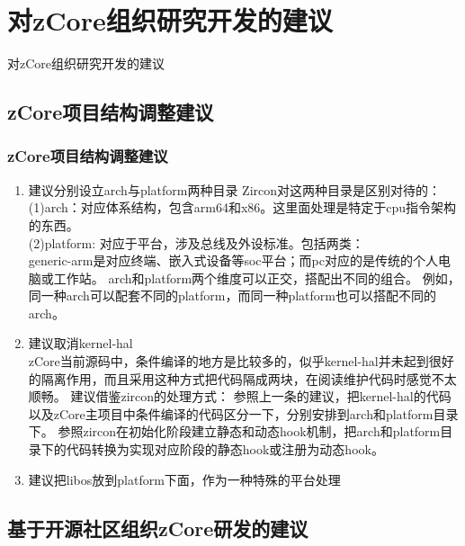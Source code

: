 \documentclass[
8pt, %
]{beamer}
\begin{document}
	\section{对zCore组织研究开发的建议}

	\begin{frame}
		\begin{center}
			{\LARGE 对zCore组织研究开发的建议\\}
		\end{center}
	\end{frame}

	\subsection{zCore项目结构调整建议}

	\begin{frame}
		\frametitle{zCore项目结构调整建议}
		\begin{enumerate}
			\item 建议分别设立arch与platform两种目录
			Zircon对这两种目录是区别对待的：\\
			(1)arch：对应体系结构，包含arm64和x86。这里面处理是特定于cpu指令架构的东西。\\
			(2)platform: 对应于平台，涉及总线及外设标准。包括两类：\\
			generic-arm是对应终端、嵌入式设备等soc平台；而pc对应的是传统的个人电脑或工作站。
			arch和platform两个维度可以正交，搭配出不同的组合。
			例如，同一种arch可以配套不同的platform，而同一种platform也可以搭配不同的arch。
			\item 建议取消kernel-hal\\
			zCore当前源码中，条件编译的地方是比较多的，似乎kernel-hal并未起到很好的隔离作用，而且采用这种方式把代码隔成两块，在阅读维护代码时感觉不太顺畅。
			建议借鉴zircon的处理方式：
			参照上一条的建议，把kernel-hal的代码以及zCore主项目中条件编译的代码区分一下，分别安排到arch和platform目录下。
			参照zircon在初始化阶段建立静态和动态hook机制，把arch和platform目录下的代码转换为实现对应阶段的静态hook或注册为动态hook。
			\item 建议把libos放到platform下面，作为一种特殊的平台处理
		\end{enumerate}
	\end{frame}

	\subsection{基于开源社区组织zCore研发的建议}
\end{document}
